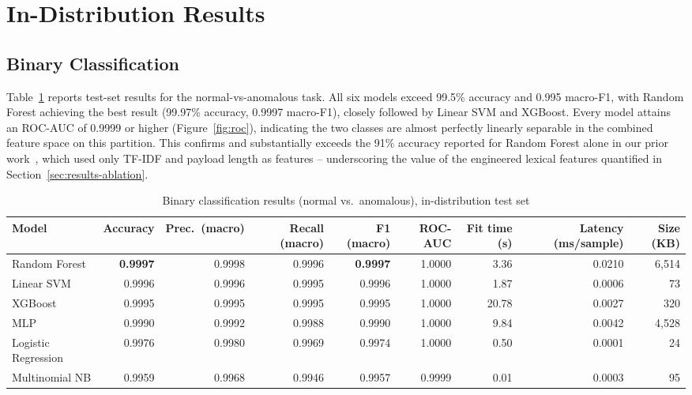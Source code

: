 \documentclass{ieeeaccess}
\begin{document}
\section{In-Distribution Results}
\label{sec:results}

\subsection{Binary Classification}

Table~\ref{tab:binary} reports test-set results for the normal-vs-anomalous
task. All six models exceed 99.5\% accuracy and 0.995 macro-F1, with Random
Forest achieving the best result (99.97\% accuracy, 0.9997 macro-F1),
closely followed by Linear SVM and XGBoost. Every model attains an ROC-AUC of
0.9999 or higher (Figure~\ref{fig:roc}), indicating the two classes are
almost perfectly linearly separable in the combined feature space on this
partition. This confirms and substantially exceeds the 91\% accuracy reported
for Random Forest alone in our prior work~\cite{ourprior}, which used only
TF-IDF and payload length as features -- underscoring the value of the
engineered lexical features quantified in Section~\ref{sec:results-ablation}.

\begin{table}[!t]
\centering
\caption{Binary classification results (normal vs.\ anomalous), in-distribution test set}
\label{tab:binary}
\begin{tabular}{lrrrrrrrr}
\toprule
Model & Accuracy & Prec.\ (macro) & Recall (macro) & F1 (macro) & ROC-AUC & Fit time (s) & Latency (ms/sample) & Size (KB) \\
\midrule
Random Forest       & \textbf{0.9997} & 0.9998 & 0.9996 & \textbf{0.9997} & 1.0000 & 3.36  & 0.0210 & 6{,}514 \\
Linear SVM           & 0.9996 & 0.9996 & 0.9995 & 0.9996 & 1.0000 & 1.87  & 0.0006 & 73 \\
XGBoost              & 0.9995 & 0.9995 & 0.9995 & 0.9995 & 1.0000 & 20.78 & 0.0027 & 320 \\
MLP                  & 0.9990 & 0.9992 & 0.9988 & 0.9990 & 1.0000 & 9.84  & 0.0042 & 4{,}528 \\
Logistic Regression  & 0.9976 & 0.9980 & 0.9969 & 0.9974 & 1.0000 & 0.50  & 0.0001 & 24 \\
Multinomial NB       & 0.9959 & 0.9968 & 0.9946 & 0.9957 & 0.9999 & 0.01  & 0.0003 & 95 \\
\bottomrule
\end{tabular}
\end{table}
\end{document}

